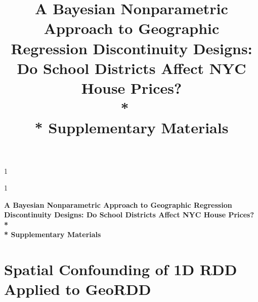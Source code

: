 \documentclass[letter,12pt]{article}
\newcommand{\blind}{1}
\newcommand{\georddtitle}{
    A Bayesian Nonparametric Approach to Geographic Regression Discontinuity Designs:
    Do School Districts Affect NYC House Prices? \\*
    ~\\*
    Supplementary Materials
}
\begin{document}


\blind
{
\title{
    \Large
    \bf
    \georddtitle
}
\author{\georddauthor}
\maketitle
} \fi

\blind
{
  \bigskip
  \bigskip
  \bigskip
  \begin{center}
    {\LARGE\bf \georddtitle}
\end{center}
  \medskip
} \fi

\section{Spatial Confounding of 1D RDD Applied to GeoRDD}
\label{sec:confounding}
\end{document}
